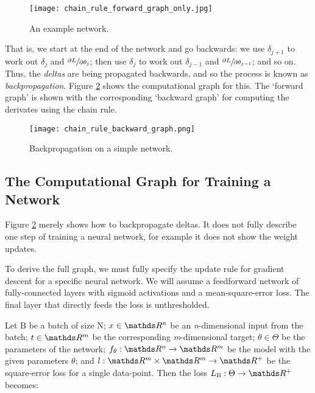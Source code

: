 \begin{figure}[t]
    \centering
    \texttt{[image: chain\_rule\_forward\_graph\_only.jpg]}
    \caption{An example network.}
    \label{fig:2-nn-chain-rule-forward}
\end{figure}

That is, we start at the end of the network and go backwards:
we use \(\delta_{j+1}\) to work out \(\delta_j\) and \(\sfrac{\partial L}{\partial \theta_j}\);
then use \(\delta_j\) to work out \(\delta_{j-1}\) and \(\sfrac{\partial L}{\partial \theta_{j-1}}\); and so on.
Thus, the \textit{deltas} are being propagated backwards, and so the process is known as \textit{backpropagation}.
Figure \ref{fig:2-nn-chain-rule-backward} shows the computational graph for this.
The `forward graph' is shown with the corresponding `backward graph' for computing the derivates using the chain rule.

\begin{figure}[htb]
    \centering
    \texttt{[image: chain\_rule\_backward\_graph.png]}
    \caption{Backpropagation on a simple network.}
    \label{fig:2-nn-chain-rule-backward}
\end{figure}

\subsection{The Computational Graph for Training a Network}

Figure \ref{fig:2-nn-chain-rule-backward} merely shows how to backpropagate deltas.
It does not fully describe one step of training a neural network, for example it does not show the weight updates.

To derive the full graph, we must fully specify the update rule for gradient descent for a specific neural network. 
We will assume a feedforward network of fully-connected layers with sigmoid activations and a mean-square-error loss.
The final layer that directly feeds the loss is unthresholded.

Let \(\mathrm{B}\) be a batch of size \(\mathrm{N}\);
\(x \in \R^n\) be an \textit{n}-dimensional input from the batch;
\(t \in \R^m\) be the corresponding \textit{m}-dimensional target;
\(\theta \in \Theta\) be the parameters of the network;
\(f_\theta : \R^n \rightarrow \R^m\) be the model with the given parameters \(\theta\); and
\(l : \R^m \times \R^m \rightarrow \R^+\) be the square-error loss for a
single data-point.
Then the loss \(L_{\mathrm{B}} : \Theta \rightarrow \R^+\) becomes:

